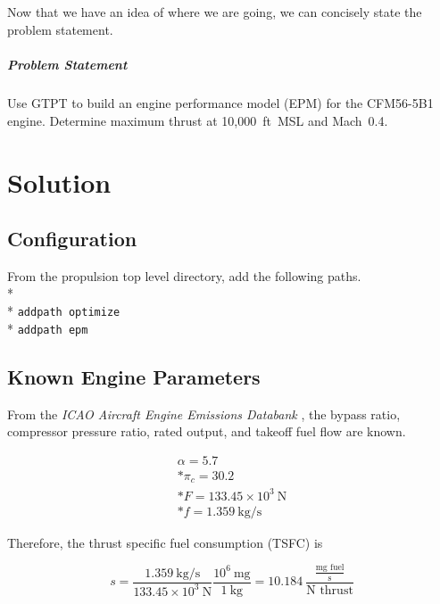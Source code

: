 \documentclass[12pt,twoside]{article}
\begin{document}
\subparagraph{}
Now that we have an idea of where we are going, we can concisely state
the problem statement.

\subparagraph{Problem Statement}
Use GTPT to build an engine performance model (EPM) for the CFM56-5B1
engine.  Determine maximum thrust at 10,000~ft~MSL and Mach~0.4.

\section{Solution}
\subsection{Configuration}
From the propulsion top level directory, add the following paths.\\*
\\*
\texttt{addpath optimize}\\*
\texttt{addpath epm}

\subsection{Known Engine Parameters}\label{sec:kno-eng-par}
From the \emph{ICAO Aircraft Engine Emissions Databank} \cite{icaoed},
the bypass ratio, compressor pressure ratio, rated output, and takeoff
fuel flow are known.

\begin{align}
  \alpha = 5.7 \label{alpha}\\*
  \pi_c = 30.2 \label{pi_c}\\*
  F = 133.45 \times 10^3 ~\text{N} \label{F}\\*
  f = 1.359 ~\text{kg/s}
\end{align}

Therefore, the thrust specific fuel consumption (TSFC) is

\begin{equation}
  s = \frac{1.359 ~\text{kg/s}}{133.45 \times 10^3 ~\text{N}} \frac{10^6 ~\text{mg}}{1 ~\text{kg}} = 10.184 ~\frac{\frac{\text{mg fuel}}{\text{s}}}{\text{N thrust}} \label{tsfc}
\end{equation}
\end{document}
